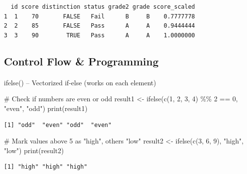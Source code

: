 \documentclass[
  letterpaper,
  DIV=11,
  numbers=noendperiod]{scrartcl}
\makeatletter
\let\oldparagraph\paragraph
\renewcommand{\paragraph}{
    \@ifstar
      \xxxParagraphStar
      \xxxParagraphNoStar
  }
\newcommand{\xxxParagraphStar}[1]{\oldparagraph*{#1}\mbox{}}
\newcommand{\xxxParagraphNoStar}[1]{\oldparagraph{#1}\mbox{}}
\newenvironment{Shaded}{\begin{snugshade}}{\end{snugshade}}
\newcommand{\CommentTok}[1]{\textcolor[rgb]{0.37,0.37,0.37}{#1}}
\newcommand{\DecValTok}[1]{\textcolor[rgb]{0.68,0.00,0.00}{#1}}
\newcommand{\FunctionTok}[1]{\textcolor[rgb]{0.28,0.35,0.67}{#1}}
\newcommand{\NormalTok}[1]{\textcolor[rgb]{0.00,0.23,0.31}{#1}}
\newcommand{\OtherTok}[1]{\textcolor[rgb]{0.00,0.23,0.31}{#1}}
\newcommand{\SpecialCharTok}[1]{\textcolor[rgb]{0.37,0.37,0.37}{#1}}
\newcommand{\StringTok}[1]{\textcolor[rgb]{0.13,0.47,0.30}{#1}}
\makeatother
\begin{document}
\begin{verbatim}
  id score distinction status grade2 grade score_scaled
1  1    70       FALSE   Fail      B     B    0.7777778
2  2    85       FALSE   Pass      A     A    0.9444444
3  3    90        TRUE   Pass      A     A    1.0000000
\end{verbatim}

\subsection{Control Flow \& Programming}\label{control-flow-programming}

\paragraph{ifelse() -- Vectorized if-else (works on each
element)}\label{ifelse-vectorized-if-else-works-on-each-element}

\begin{Shaded}
\begin{Highlighting}[]
\CommentTok{\#   Check if numbers are even or odd}
\NormalTok{result1 }\OtherTok{\textless{}{-}} \FunctionTok{ifelse}\NormalTok{(}\FunctionTok{c}\NormalTok{(}\DecValTok{1}\NormalTok{, }\DecValTok{2}\NormalTok{, }\DecValTok{3}\NormalTok{, }\DecValTok{4}\NormalTok{) }\SpecialCharTok{\%\%} \DecValTok{2} \SpecialCharTok{==} \DecValTok{0}\NormalTok{, }\StringTok{"even"}\NormalTok{, }\StringTok{"odd"}\NormalTok{)}
\FunctionTok{print}\NormalTok{(result1)}
\end{Highlighting}
\end{Shaded}

\begin{verbatim}
[1] "odd"  "even" "odd"  "even"
\end{verbatim}

\begin{Shaded}
\begin{Highlighting}[]
\CommentTok{\#   Mark values above 5 as "high", others "low"}
\NormalTok{result2 }\OtherTok{\textless{}{-}} \FunctionTok{ifelse}\NormalTok{(}\FunctionTok{c}\NormalTok{(}\DecValTok{3}\NormalTok{, }\DecValTok{6}\NormalTok{, }\DecValTok{9}\NormalTok{), }\StringTok{"high"}\NormalTok{, }\StringTok{"low"}\NormalTok{)}
\FunctionTok{print}\NormalTok{(result2)}
\end{Highlighting}
\end{Shaded}

\begin{verbatim}
[1] "high" "high" "high"
\end{verbatim}
\end{document}
